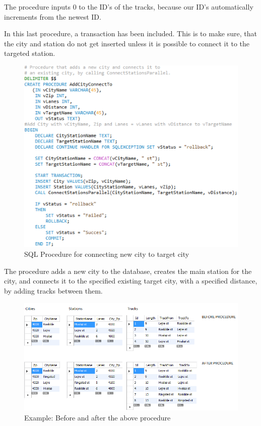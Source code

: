The procedure inputs 0 to the ID's of the tracks, because our ID's 
automatically increments from the newest ID.

\newpage
In this last procedure, a transaction has been included. This is to make sure, 
that the city and station do not get inserted unless it is possible to connect 
it to the targeted station.

\begin{figure}[ht!]
    \centering
    \includegraphics[width=1\textwidth]{img/SQL_PROCEDURE_AddCityConnect}
    \caption{SQL Procedure for connecting new city to target city}
\end{figure}

The procedure adds a new city to the database, creates the main station for the 
city, and connects it to the specified existing target city, with a specified 
distance, by adding tracks between them.

\begin{figure}[ht!]
    \centering
    \includegraphics[width=1\textwidth]{img/SQL_PROCEDURE_AddCityConnect_example}
    \caption{Example: Before and after the above procedure}
\end{figure}

